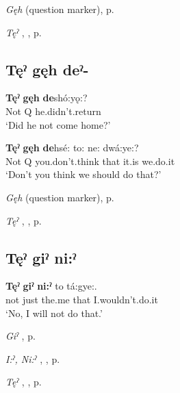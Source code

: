 \begin{CayugaRelated}
\item \textit{Gęh}  (question marker), p. \pageref{p:[gęh] `Q’}\\
\item \textit{Tęˀ} , , p. \pageref{p:[tęˀ]}
\end{CayugaRelated}

\subsection*{\textbf{Tęˀ gęh deˀ-} } \label{p:[tęˀ gęh deˀ-]}

\ea
\label{ex:tpart29}
\gll \textbf{Tęˀ} \textbf{gęh} \textbf{de}shó:yǫ:? {}\\
Not Q he.didn’t.return\\
\glt ‘Did he not come home?’
\z

\ea
\label{ex:tpart30}
\gll \textbf{Tęˀ} \textbf{gęh} \textbf{de}hsé: to: ne: dwá:ye:?\\
Not Q you.don’t.think that it.is we.do.it\\
\glt ‘Don’t you think we should do that?’
\z


\begin{CayugaRelated}
\item \textit{Gęh}  (question marker), p. \pageref{p:[gęh] `Q’}\\
\item \textit{Tęˀ} , , p. \pageref{p:[tęˀ]}
\end{CayugaRelated}

\subsection*{\textbf{Tęˀ giˀ ni:ˀ} } \label{p:[tęˀ giˀ ni:ˀ]}

\ea
\label{ex:tpart33}
\gll \textbf{Tęˀ} \textbf{giˀ} \textbf{ni:ˀ} to tá:gye:.\\
not just the.me that I.wouldn’t.do.it\\
\glt ‘No, I will not do that.’
\z

\begin{CayugaRelated}
\item \textit{Giˀ} , p. \pageref{p:[giˀ]}\\
\item \textit{I:ˀ, Ni:ˀ} , , p. \pageref{p:[i:ˀ]}\\
\item \textit{Tęˀ} , , p. \pageref{p:[tęˀ]}
\end{CayugaRelated}

